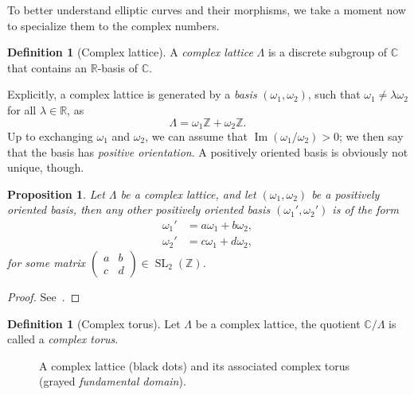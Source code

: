 \documentclass[10pt]{article}
\newcommand{\axes}[4]{
  \clip (#1,#3) rectangle (#2,#4);
  \draw [thin, gray, -latex] (#1,0) -- (#2,0);%
  \draw [thin, gray, -latex] (0,#3) -- (0,#4);%
}
\newcommand{\lattice}[3][2pt]{
  \draw[style=help lines,dashed] (#2-1,#2-1) grid[step=1] (#3+1,#3+1);
  \foreach \x in {#2,...,#3}{
    \foreach \y in {#2,...,#3}{
      \node[draw,circle,inner sep=#1,fill] at (\x,\y) {};
    }
  }
}
\theoremstyle{plain}
\newtheorem{proposition}[theorem]{Proposition}
\theoremstyle{definition}
\newtheorem{definition}[theorem]{Definition}
\DeclareMathOperator{\im}{Im} %
\DeclareMathOperator{\SL}{SL}
\begin{document}
To better understand elliptic curves and their morphisms, we take a
moment now to specialize them to the complex numbers.

\begin{definition}[Complex lattice]
  A \emph{complex lattice} $Λ$ is a discrete subgroup of $ℂ$ that
  contains an $ℝ$-basis of $ℂ$.
\end{definition}

Explicitly, a complex lattice is generated by a \emph{basis}
$(ω_1,ω_2)$, such that $ω_1≠λω_2$ for all $λ∈ℝ$, as
\[Λ = ω_1ℤ + ω_2ℤ.\] %
Up to exchanging $ω_1$ and $ω_2$, we can assume that $\im(ω_1/ω_2)>0$;
we then say that the basis has \emph{positive orientation}. %
A positively oriented basis is obviously not unique, though.

\begin{proposition}
  \label{th:basis-change}
  Let $Λ$ be a complex lattice, and let $(ω_1,ω_2)$ be a positively
  oriented basis, then any other positively oriented basis
  $(ω_1',ω_2')$ is of the form
  \begin{align*}
    ω_1' &= aω_1 + bω_2,\\
    ω_2' &= cω_1 + dω_2,
  \end{align*}
  for some matrix
  $\left(\begin{smallmatrix}a&b\\c&d\end{smallmatrix}\right)∈\SL_2(ℤ)$.
\end{proposition}
\begin{proof}
  See~\cite[I, Lem.~2.4]{silverman:advanced}.
\end{proof}

\begin{definition}[Complex torus]
  Let $Λ$ be a complex lattice, the quotient $ℂ/Λ$ is called a
  \emph{complex torus}.
\end{definition}

\begin{figure}
  \centering

  \caption{A complex lattice (black dots) and its associated complex
    torus (grayed \emph{fundamental domain}).}
  \label{fig:lattice}
\end{figure}
\end{document}
